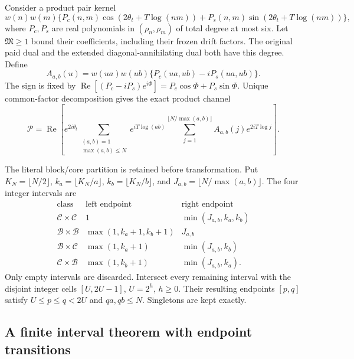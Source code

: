\documentclass[11pt]{article}
\numberwithin{equation}{section}
\theoremstyle{definition}
\theoremstyle{remark}
\begin{document}
Consider a product pair kernel
\[
 w(n)w(m)\{P_c(n,m)\cos(2\theta_t+T\log(nm))
             +P_s(n,m)\sin(2\theta_t+T\log(nm))\},
\]
where $P_c,P_s$ are real polynomials in $(\rho_n,\rho_m)$ of total
 degree at most six.  Let $\mathfrak M\ge1$ bound their coefficients,
including their frozen drift factors.  The original paid dual and the
extended diagonal-annihilating dual both have this degree.  Define
\begin{equation}
\label{tr:product-amplitude}
 A_{a,b}(u)=w(ua)w(ub)\{P_c(ua,ub)-iP_s(ua,ub)\}.
\end{equation}
The sign is fixed by
$\operatorname{Re}[(P_c-iP_s)e^{i\Phi}]=P_c\cos\Phi+P_s\sin\Phi$.
Unique common-factor decomposition gives the exact product channel
\begin{equation}
\label{tr:product-cf}
 \mathcal P=\operatorname{Re}\left[
 e^{2i\theta_t}\sum_{\substack{(a,b)=1\\\max(a,b)\le N}}
 e^{iT\log(ab)}
 \sum_{j=1}^{\lfloor N/\max(a,b)\rfloor}
 A_{a,b}(j)e^{2iT\log j}\right].
\end{equation}

The literal block/core partition is retained before transformation.
Put $K_N=\lfloor N/2\rfloor$, $k_a=\lfloor K_N/a\rfloor$,
$k_b=\lfloor K_N/b\rfloor$, and $J_{a,b}=\lfloor N/\max(a,b)\rfloor$.
The four integer intervals are
\[
\begin{array}{c|cc}
 \text{class}&\text{left endpoint}&\text{right endpoint}\\\hline
 \mathcal C\times\mathcal C&1&\min(J_{a,b},k_a,k_b)\\
 \mathcal B\times\mathcal B&\max(1,k_a+1,k_b+1)&J_{a,b}\\
 \mathcal B\times\mathcal C&\max(1,k_a+1)&\min(J_{a,b},k_b)\\
 \mathcal C\times\mathcal B&\max(1,k_b+1)&\min(J_{a,b},k_a).
\end{array}
\]
Only empty intervals are discarded.  Intersect every remaining interval
with the disjoint integer cells $[U,2U-1]$, $U=2^h$, $h\ge0$.
Their resulting endpoints $[p,q]$ satisfy
$U\le p\le q<2U$ and $qa,qb\le N$.  Singletons are kept exactly.

\subsection{A finite interval theorem with endpoint transitions}
\end{document}
